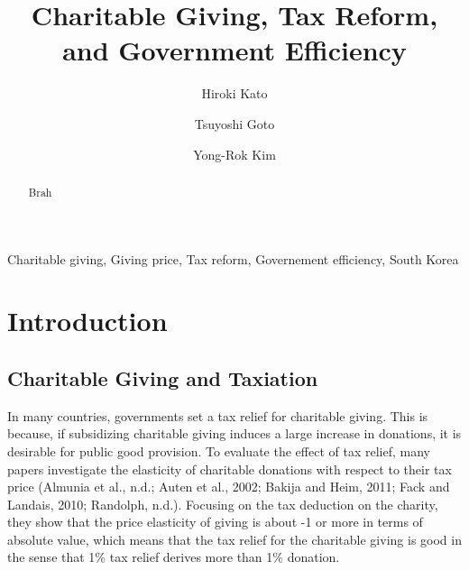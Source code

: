\documentclass[ review  , 3p ]{elsarticle}
\begin{document}
  \begin{frontmatter}

    \title{Charitable Giving, Tax Reform, and Government Efficiency}
                \author[Osaka University]{
      Hiroki Kato 
       \corref{*} }
        \author[Chiba University]{
      Tsuyoshi Goto 
      }
        \author[Kobe University]{
      Yong-Rok Kim 
      }
            \address[Osaka University]{Graduate School of Economics, Osaka University, Japan}
        \address[Chiba University]{Graduate School of Economics, Chiba University, Japan}
        \address[Kobe University]{Graduate School of Economics, Kobe University, Japan}
      
        \begin{abstract}
      Brah
    \end{abstract}
      
        \begin{keyword}
      Charitable giving, Giving price, Tax reform, Governement efficiency, South Korea
    \end{keyword}
    
  \end{frontmatter}

  \hypertarget{introduction}{%
  \section{Introduction}\label{introduction}}
  
  \hypertarget{charitable-giving-and-taxiation}{%
  \subsection{Charitable Giving and Taxiation}\label{charitable-giving-and-taxiation}}
  
  In many countries, governments set a tax relief for charitable giving. This is because, if subsidizing charitable giving induces a large increase in donations, it is desirable for public good provision. To evaluate the effect of tax relief, many papers investigate the elasticity of charitable donations with respect to their tax price (Almunia et al., n.d.; Auten et al., 2002; Bakija and Heim, 2011; Fack and Landais, 2010; Randolph, n.d.). Focusing on the tax deduction on the charity, they show that the price elasticity of giving is about -1 or more in terms of absolute value, which means that the tax relief for the charitable giving is good in the sense that 1\% tax relief derives more than 1\% donation.
  
\end{document}
